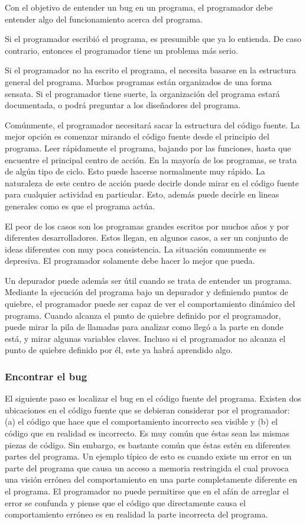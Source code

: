 \documentclass[12pt,legalpaper]{report}
\begin{document}
Con el objetivo de entender un bug en un programa, el programador debe entender algo del funcionamiento acerca del programa.

Si el programador escribió el programa, es presumible que ya lo entienda.  De caso contrario, entonces el programador tiene un problema más serio.

Si el programador no ha escrito el programa, el necesita basarse en la estructura general del programa.  Muchos programas están organizados de una forma sensata.  Si el programador tiene suerte, la organización del programa estará documentada, o podrá preguntar a los diseñadores del programa.

Comúnmente, el programador necesitará sacar la estructura del código fuente.  La mejor opción es comenzar mirando el código fuente desde el principio del programa.  Leer rápidamente el programa, bajando por las funciones, hasta que encuentre el principal centro de acción.  En la mayoría de los programas, se trata de algún tipo de ciclo.  Esto puede hacerse normalmente  muy rápido.  La naturaleza de este centro de acción puede decirle donde mirar en el código fuente para cualquier actividad en particular.  Esto, además puede decirle en lineas generales como es que el programa actúa.

El peor de los casos son los programas grandes escritos por muchos años y por diferentes desarrolladores.  Estos llegan, en algunos casos, a ser un conjunto de ideas diferentes con muy poca consistencia.  La situación comunmente es depresiva.  El programador solamente debe hacer lo mejor que pueda.

Un depurador puede además ser útil cuando se trata de entender un programa.  Mediante la ejecución del programa bajo un depurador y definiendo puntos de quiebre, el programador puede ser capaz de ver el comportamiento dinámico del programa.  Cuando alcanza el punto de quiebre definido por el programador, puede mirar la pila de llamadas para analizar como llegó a la parte en donde está, y mirar algunas variables claves.  Incluso si el programador no alcanza el punto de quiebre definido por él, este ya habrá aprendido algo.


\subsubsection{Encontrar el bug}

El siguiente paso es localizar el bug en el código fuente del programa.  Existen dos ubicaciones en el código fuente que se debieran considerar por el programador: (a) el código que hace que el comportamiento incorrecto sea visible y (b) el código que en realidad es incorrecto.  Es muy común que éstas sean las mismas piezas de código.  Sin embargo, es bastante común que éstas estén en diferentes partes del programa.  Un ejemplo típico de esto es cuando existe un error en un parte del programa que causa un acceso a memoria restringida el cual provoca una visión errónea del comportamiento en una parte completamente diferente en el programa.  El programador no puede permitirse que en el afán de arreglar el error se confunda y piense que el código que directamente causa el comportamiento erróneo es en realidad la parte incorrecta del programa.
\end{document}
